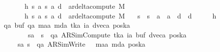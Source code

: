 \begin{isabellebody}
\ \ \ \ \ \ \ h{}{\isacharcolon}{\kern0pt}\ {\isachardoublequoteopen}{\isacharparenleft}{\kern0pt}s{\isacharcomma}{\kern0pt}\ a{\isacharcomma}{\kern0pt}\ s{}{\isacharcomma}{\kern0pt}\ a{}{\isacharcomma}{\kern0pt}\ d{}{\isacharparenright}{\kern0pt}\ {\isasymin}\ ar{\isacharunderscore}{\kern0pt}delta{\isacharunderscore}{\kern0pt}compute\ M{\isachardoublequoteclose}\isanewline
\ \ \ \ \ \ \ h{}{\isacharcolon}{\kern0pt}\ {\isachardoublequoteopen}{\isacharparenleft}{\kern0pt}s{\isacharcomma}{\kern0pt}\ a{\isacharcomma}{\kern0pt}\ s{}{\isacharcomma}{\kern0pt}\ a{}{\isacharcomma}{\kern0pt}\ d{}{\isacharparenright}{\kern0pt}\ {\isasymin}\ ar{\isacharunderscore}{\kern0pt}delta{\isacharunderscore}{\kern0pt}compute\ M{\isachardoublequoteclose}\isanewline
\ \ \ {\isachardoublequoteopen}s{}\ {\isacharequal}{\kern0pt}\ s{}\ {\isasymand}\ a{}\ {\isacharequal}{\kern0pt}\ a{}\ {\isasymand}\ d{}\ {\isacharequal}{\kern0pt}\ d{}{\isachardoublequoteclose}\isanewline
%
\isadelimproof
%
\endisadelimproof
%
\isatagproof
{}\isamarkupfalse%
\ {\isacharminus}{\kern0pt}\isanewline
\ \ \isamarkupfalse%
\ h{}\ \isamarkupfalse%
\ qa\ buf\ qa{\isacharprime}{\kern0pt}\ m{\isacharunderscore}{\kern0pt}aa{\isacharprime}{\kern0pt}\ m{\isacharunderscore}{\kern0pt}da\ tka\ ia\ dveca\ poska\ \isanewline
\ \ \ \ \ \ \ \ sa{\isacharcolon}{\kern0pt}\ \ {\isachardoublequoteopen}s\ {\isacharequal}{\kern0pt}\ {\isacharparenleft}{\kern0pt}qa{\isacharcomma}{\kern0pt}\ AR{\isacharunderscore}{\kern0pt}SimCompute{\isacharcomma}{\kern0pt}\ tka{\isacharcomma}{\kern0pt}\ ia{\isacharcomma}{\kern0pt}\ buf{\isacharcomma}{\kern0pt}\ dveca{\isacharcomma}{\kern0pt}\ poska{\isacharparenright}{\kern0pt}{\isachardoublequoteclose}\isanewline
\ \ \ \ \ s{}a{\isacharcolon}{\kern0pt}\ {\isachardoublequoteopen}s{}\ {\isacharequal}{\kern0pt}\ {\isacharparenleft}{\kern0pt}qa{\isacharprime}{\kern0pt}{\isacharcomma}{\kern0pt}\ AR{\isacharunderscore}{\kern0pt}SimWrite{\isacharcomma}{\kern0pt}\ {}{\isacharcomma}{\kern0pt}\ {}{\isacharcomma}{\kern0pt}\ m{\isacharunderscore}{\kern0pt}aa{\isacharprime}{\kern0pt}{\isacharcomma}{\kern0pt}\ m{\isacharunderscore}{\kern0pt}da{\isacharcomma}{\kern0pt}\ poska{\isacharparenright}{\kern0pt}{\isachardoublequoteclose}\isanewline

\end{isabellebody}
